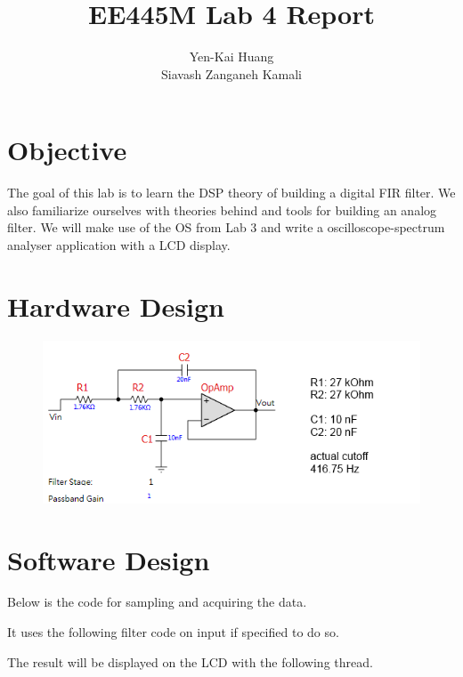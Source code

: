 \documentclass[a4paper]{article}
\newlength{\pic}
\begin{document}
\title{EE445M Lab 4 Report}
\author{Yen-Kai Huang \\ Siavash Zanganeh Kamali}
\maketitle

\section{Objective} The goal of this lab is to learn the DSP theory of building a digital FIR filter. We also
familiarize ourselves with theories behind and tools for building an analog filter. We will make use of the OS
from Lab 3 and write a oscilloscope-spectrum analyser application with a LCD display.

\section{Hardware Design} 

\setlength{\pic}{0.75\textwidth}
\begin{figure}[htp]
	\center
	\includegraphics[width=\pic]{filterdesign}
\end{figure}

\section{Software Design}
Below is the code for sampling and acquiring the data.

\lstset{language=C, style=MyCStyle}


It uses the following filter code on input if specified to do so.

\lstset{language=C, style=MyCStyle}


The result will be displayed on the LCD with the following thread.

\lstset{language=C, style=MyCStyle}

\end{document}
